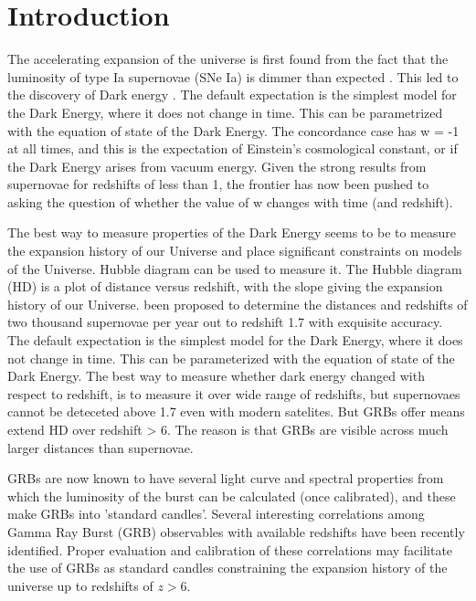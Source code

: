 \section{Introduction}
The accelerating expansion of the universe is first found from the fact that the luminosity of type Ia supernovae (SNe Ia) is dimmer than expected \cite{riess1998observational}. This led to the discovery of Dark energy \cite{perlmutter1999measurements}. The default expectation is the simplest model for the Dark Energy, where it does not change in time. This can be parametrized with the equation of state of the Dark Energy. The concordance case has w = -1 at all times, and this is the expectation of Einstein’s cosmological constant, or if the Dark Energy arises from vacuum energy. Given the strong results from supernovae for redshifts of less than 1, the frontier has now been pushed to asking the question of whether the value of w changes with time (and redshift).

The best way to measure properties of the Dark Energy seems to be to measure the expansion history of our Universe and place significant constraints on models of the Universe. Hubble diagram can be used to measure it. The Hubble diagram (HD) is a plot of distance versus redshift, with the slope giving the expansion history of our Universe. been proposed to determine the distances and redshifts of two thousand supernovae per year out to redshift 1.7 with exquisite accuracy. The default expectation is the simplest model for the Dark Energy, where it does not change in time. This can be parameterized with the equation of state of the Dark Energy. The best way to measure whether dark energy changed with respect to redshift, is to measure it over wide range of redshifts, but supernovaes cannot be deteceted above 1.7 even with modern satelites. But GRBs offer means extend HD over redshift > 6. The reason is that GRBs are visible across much larger distances than supernovae.

GRBs are now known to have several light curve and spectral properties from which the luminosity of the burst can be calculated (once calibrated), and these make GRBs into ’standard candles’. Several interesting correlations among Gamma Ray Burst (GRB) observables with available redshifts have been recently identified. Proper evaluation and calibration of these correlations may facilitate the use of GRBs as standard candles constraining the expansion history of the universe up to redshifts of $z > 6$.